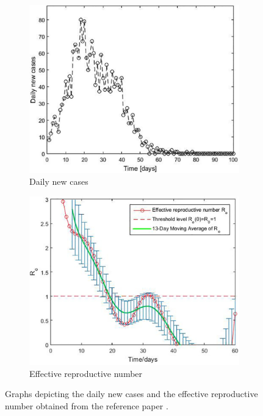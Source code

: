 \documentclass[a4paper]{article}
\begin{document}
\begin{figure}[h!]
	\centering
	\begin{subfigure}{.5\textwidth}
		\centering
		\includegraphics[width=\textwidth]{images/dnc-orig.jpg}
		\caption{Daily new cases}
		\label{figure:rp-dnc}
	\end{subfigure}%
	\begin{subfigure}{.5\textwidth}
		\centering
		\includegraphics[width=\textwidth]{images/r_e-orig.jpg}
		\caption{Effective reproductive number}
		\label{figure:rp-r-e}
	\end{subfigure}
	\caption{Graphs depicting the daily new cases and the effective reproductive number obtained from the reference paper \cite{Maltezos2021}.}
	\label{figure:results-reference-paper}
\end{figure}
\end{document}
